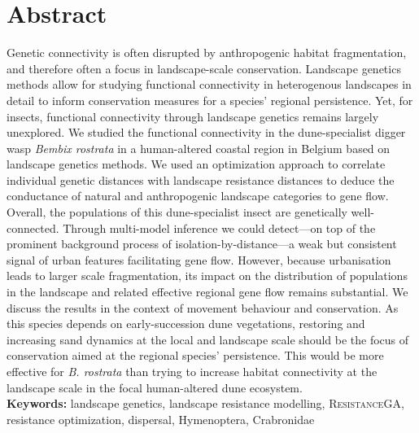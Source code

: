 \documentclass[10pt, twoside]{book} %
\begin{document}
	\color{black}
	\newpage
	\section{Abstract}
	Genetic connectivity is often disrupted by anthropogenic habitat fragmentation, and therefore often a focus in landscape-scale conservation. Landscape genetics methods allow for studying functional connectivity in heterogenous landscapes in detail to inform conservation measures for a species' regional persistence. Yet, for insects, functional connectivity through landscape genetics remains largely unexplored. We studied the functional connectivity in the dune-specialist digger wasp \textit{Bembix rostrata} in a human-altered coastal region in Belgium based on landscape genetics methods. We used an optimization approach to correlate individual genetic distances with landscape resistance distances to deduce the conductance of natural and anthropogenic landscape categories to gene flow. Overall, the populations of this dune-specialist insect are genetically well-connected. Through multi-model inference we could detect---on top of the prominent background process of isolation-by-distance---a weak but consistent signal of urban features facilitating gene flow. However, because urbanisation leads to larger scale fragmentation, its impact on the distribution of populations in the landscape and related effective regional gene flow remains substantial. We discuss the results in the context of movement behaviour and conservation. As this species depends on early-succession dune vegetations, restoring and increasing sand dynamics at the local and landscape scale should be the focus of conservation aimed at the regional species' persistence. This would be more effective for \textit{B. rostrata} than trying to increase habitat connectivity at the landscape scale in the focal human-altered dune ecosystem.\\
	
	\vspace*{\fill}
	\noindent \textbf{Keywords:} landscape genetics, landscape resistance modelling, \textsc{ResistanceGA}, resistance optimization, dispersal, Hymenoptera, Crabronidae
	
	\clearpage
\end{document}
